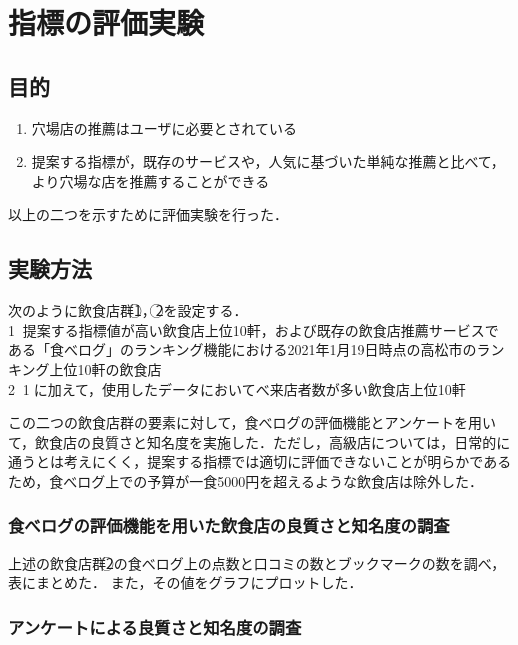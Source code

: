 \chapter{指標の評価実験}

\newcommand{\ctext}[1]{\textcircled{\scriptsize #1}}

\label{chap:experiment}

\section{目的}
		\begin{enumerate}
			\item 穴場店の推薦はユーザに必要とされている
			\item 提案する指標が，既存のサービスや，人気に基づいた単純な推薦と比べて，より穴場な店を推薦することができる
		\end{enumerate}
以上の二つを示すために評価実験を行った．
\section{実験方法}

次のように飲食店群\ctext{1}，\ctext{2}を設定する．\\
	\ctext{1}：提案する指標値が高い飲食店上位10軒，および既存の飲食店推薦サービスである「食べログ」のランキング機能における2021年1月19日時点の高松市のランキング上位10軒の飲食店\\
	\ctext{2}：\ctext{1}に加えて，使用したデータにおいてべ来店者数が多い飲食店上位10軒\par
	この二つの飲食店群の要素に対して，食べログの評価機能とアンケートを用いて，飲食店の良質さと知名度を実施した．ただし，高級店については，日常的に通うとは考えにくく，提案する指標では適切に評価できないことが明らかであるため，食べログ上での予算が一食5000円を超えるような飲食店は除外した．
	\subsection{食べログの評価機能を用いた飲食店の良質さと知名度の調査}\label{exp:scrutiny}

		上述の飲食店群\ctext{2}の食べログ上の点数と口コミの数とブックマークの数を調べ，表にまとめた．
		また，その値をグラフにプロットした．

	\subsection{アンケートによる良質さと知名度の調査}\label{exp:questionnaire}

